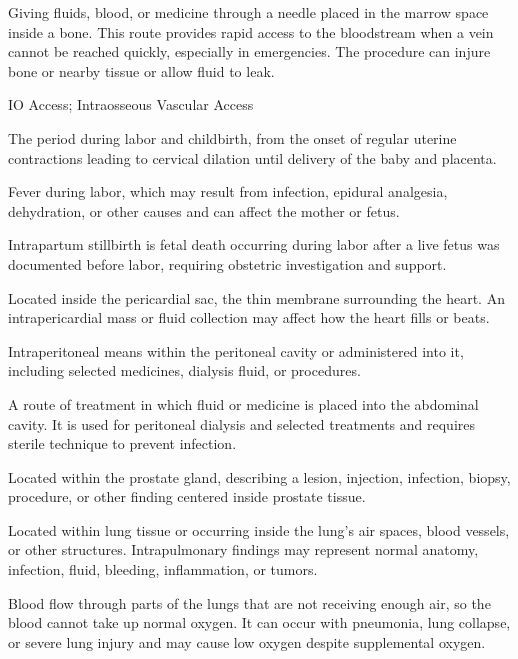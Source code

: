  Giving fluids, blood, or medicine through a needle placed in the marrow space inside a bone. This route provides rapid access to the bloodstream when a vein cannot be reached quickly, especially in emergencies. The procedure can injure bone or nearby tissue or allow fluid to leak.

\synonyms
IO Access; Intraosseous Vascular Access

 The period during labor and childbirth, from the onset of regular uterine contractions
leading to cervical dilation until delivery of the baby and placenta.

 Fever during labor, which may result from infection, epidural analgesia, dehydration, or other causes and can affect the mother or fetus.

 Intrapartum stillbirth is fetal death occurring during labor after a live fetus was documented before labor, requiring obstetric investigation and support.

 Located inside the pericardial sac, the thin membrane surrounding the heart. An intrapericardial mass or fluid collection may affect how the heart fills or beats.

 Intraperitoneal means within the peritoneal cavity or administered into it, including selected medicines, dialysis fluid, or procedures.

 A route of treatment in which fluid or medicine is placed into the abdominal cavity. It is used for peritoneal dialysis and selected treatments and requires sterile technique to prevent infection.

 Located within the prostate gland, describing a lesion, injection, infection, biopsy, procedure, or other finding centered inside prostate tissue.

 Located within lung tissue or occurring inside the lung’s air spaces, blood vessels, or other structures. Intrapulmonary findings may represent normal anatomy, infection, fluid, bleeding, inflammation, or tumors.

 Blood flow through parts of the lungs that are not receiving enough air, so the blood cannot take up normal oxygen. It can occur with pneumonia, lung collapse, or severe lung injury and may cause low oxygen despite supplemental oxygen.

